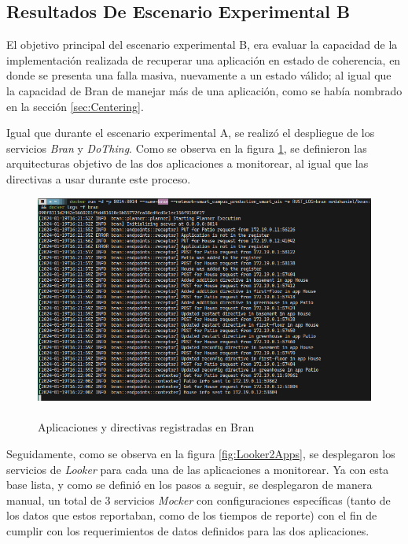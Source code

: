 \subsection{Resultados De Escenario Experimental B}

El objetivo principal del escenario experimental B, era evaluar la capacidad de la implementación realizada de recuperar una aplicación en estado de coherencia, en donde se presenta una falla masiva, nuevamente a un estado válido; al igual que la capacidad de Bran de manejar más de una aplicación, como se había nombrado en la sección \ref{sec:Centering}.

Igual que durante el escenario experimental A, se realizó el despliegue de los servicios \textit{Bran} y \textit{DoThing}. Como se observa en la figura \ref{fig:Bran2Apps}, se definieron las arquitecturas objetivo de las dos aplicaciones a monitorear, al igual que las directivas a usar durante este proceso.

\begin{figure}[ht]
    \centering
    \caption{\\Aplicaciones y directivas registradas en Bran}
    \label{fig:Bran2Apps}
    \includegraphics[width=0.9\linewidth]{images/BranBScenarioDeclarition.png}
    \vspace{-4mm}
\end{figure}

Seguidamente, como se observa en la figura \ref{fig:Looker2Apps}, se desplegaron los servicios de \textit{Looker} para cada una de las aplicaciones a monitorear. Ya con esta base lista, y como se definió en los pasos a seguir, se desplegaron de manera manual, un total de 3 servicios \textit{Mocker} con configuraciones específicas (tanto de los datos que estos reportaban, como de los tiempos de reporte) con el fin de cumplir con los requerimientos de datos definidos para las dos aplicaciones. 

